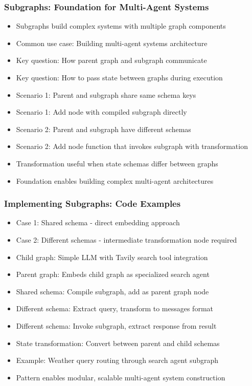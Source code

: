 \begin{frame}[fragile]\frametitle{Subgraphs: Foundation for Multi-Agent Systems}
      \begin{itemize}
          \item Subgraphs build complex systems with multiple graph components
          \item Common use case: Building multi-agent systems architecture
          \item Key question: How parent graph and subgraph communicate
          \item Key question: How to pass state between graphs during execution
          \item Scenario 1: Parent and subgraph share same schema keys
          \item Scenario 1: Add node with compiled subgraph directly
          \item Scenario 2: Parent and subgraph have different schemas
          \item Scenario 2: Add node function that invokes subgraph with transformation
          \item Transformation useful when state schemas differ between graphs
          \item Foundation enables building complex multi-agent architectures
      \end{itemize}
\end{frame}

\begin{frame}[fragile]\frametitle{Implementing Subgraphs: Code Examples}
      \begin{itemize}
          \item Case 1: Shared schema - direct embedding approach
          \item Case 2: Different schemas - intermediate transformation node required
          \item Child graph: Simple LLM with Tavily search tool integration
          \item Parent graph: Embeds child graph as specialized search agent
          \item Shared schema: Compile subgraph, add as parent graph node
          \item Different schema: Extract query, transform to messages format
          \item Different schema: Invoke subgraph, extract response from result
          \item State transformation: Convert between parent and child schemas
          \item Example: Weather query routing through search agent subgraph
          \item Pattern enables modular, scalable multi-agent system construction
      \end{itemize}
\end{frame}


